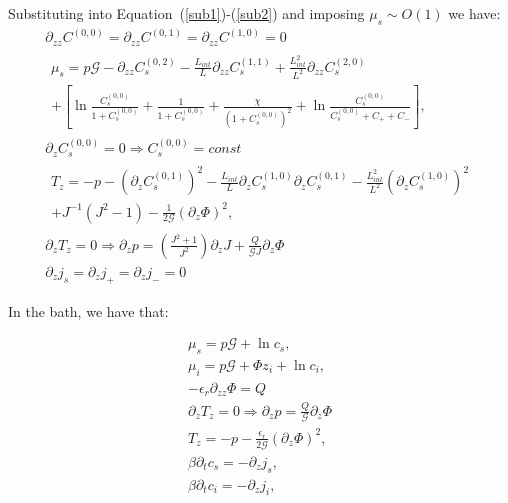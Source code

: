 Substituting into Equation~(\ref{sub1})-(\ref{sub2}) and imposing $\mu_s\sim O(1)$ we have:
\begin{gather}
\partial_{zz} C^{(0,0)}=\partial_{zz} C^{(0,1)}=\partial_{zz} C^{(1,0)}=0\\
\begin{aligned}
\mu_s = p \mathcal{G} - \partial_{zz} C^{(0,2)}_s - \frac{L_{int}}{L}\partial_{zz} C^{(1,1)}_s+ \frac{L^2_{int}}{L^2}\partial_{zz} C^{(2,0)}_s\\
+\left[\ln \frac{C^{(0,0)}_s}{1+C^{(0,0)}_s}+ \frac{1}{1+C^{(0,0)}_s} +\frac{\chi}{(1+C^{(0,0)}_s)^2} + \ln \frac{C^{(0,0)}_s}{C^{(0,0)}_s+C_++C_-} \right], 
\end{aligned}\\[2.5mm]
\partial_z C^{(0,0)}_s=0 \Rightarrow C^{(0,0)}_s= const\\
\begin{aligned}
T_z= -p -(\partial_z C^{(0,1)}_s)^2-\frac{L_{int}}{L}\partial_{z} C^{(1,0)}_s\partial_{z} C^{(0,1)}_s-\frac{L_{int}^2}{L^2}(\partial_{z} C^{(1,0)}_s)^2\\
+  J^{-1}\left(J^2-1\right)-\frac{1}{2\mathcal{G}}(\partial_z \Phi)^2,
\end{aligned}\\[2mm]
\partial_z T_z = 0 \Rightarrow \partial_z p = \left(\frac{J^2+1}{J^2}\right)\partial_z J + \frac{Q}{\mathcal{G}J}\partial_z \Phi\\
\partial_z j_s=\partial_z j_+=\partial_z j_- = 0
\end{gather}

In the bath, we have that:

\begin{gather}
\mu_s = p \mathcal{G}+\ln c_s ,\\
\mu_i = p \mathcal{G}+ \Phi z_i + \ln c_i ,\\
- \epsilon_r\partial_{zz}\Phi = Q\, \\
\partial_z T_z=0 \Rightarrow \partial_z p = \frac{Q}{\mathcal{G}}\partial_z \Phi\\
T_z= -p -\frac{\epsilon_r}{2\mathcal{G}}(\partial_z \Phi)^2,\\
\beta\partial_t c_s =- \partial_z j_s,\\
\beta\partial_t c_i = -\partial_z j_i,
\end{gather}

